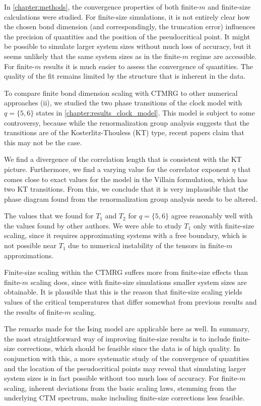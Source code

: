 In \autoref{chapter:methods}, the convergence properties of both finite-$m$ and finite-size calculations were studied.
For finite-size simulations, it is not entirely clear how the chosen bond dimension (and correspondingly,
the truncation error) influences the precision of quantities and the position of the pseudocritical point.
It might be possible to simulate larger system sizes without much loss of accuracy,
but it seems unlikely that the same system sizes as in the finite-$m$ regime are accessible.
For finite-$m$ results it is much easier to assess the convergence of quantities.
The quality of the fit remains limited by the structure that is inherent in the data.

To compare finite bond dimension scaling with CTMRG to other numerical approaches (ii),
we studied the two phase transitions of the clock model with $q = \{5,
6\}$ states in \autoref{chapter:results_clock_model}.
This model is subject to some controversy, because while the renormalization group analysis suggests that the
transitions are of the Kosterlitz-Thouless (KT) type, recent papers claim that this may not be the case.

We find a divergence of the correlation length that is consistent with the KT picture.
Furthermore, we find a varying value for the correlator exponent $\eta$ that comes close to exact values for the model
in the Villain formulation, which has two KT transitions.
From this, we conclude that it is very implausible that the phase diagram
found from the renormalization group analysis needs to be altered.

The values that we found for $T_1$ and $T_2$ for $q = \{ 5, 6 \}$ agree reasonably well with the values found by other
authors.
We were able to study $T_1$ only with finite-size scaling, since it requires approximating systems with a free boundary,
which is not possible near $T_1$ due to numerical instability of the tensors in finite-$m$ approximations.

Finite-size scaling within the CTMRG suffers more from finite-size effects than finite-$m$ scaling does,
since with finite-size simulations smaller system sizes are obtainable.
It is plausible that this is the reason that finite-size scaling yields values of the critical temperatures that differ
somewhat from previous results and the results of finite-$m$ scaling.

The remarks made for the Ising model are applicable here as well. In summary,
the most straightforward way of improving finite-size results is to include finite-size corrections,
which should be feasible since the data is of high quality.
In conjunction with this, a more systematic study of the convergence of quantities and the location of the
pseudocritical points may reveal that
simulating larger system sizes is in fact possible without too much loss of accuracy.
For finite-$m$ scaling, inherent deviations from the basic scaling laws, stemming from the underlying CTM spectrum, make
including finite-size corrections less feasible.

